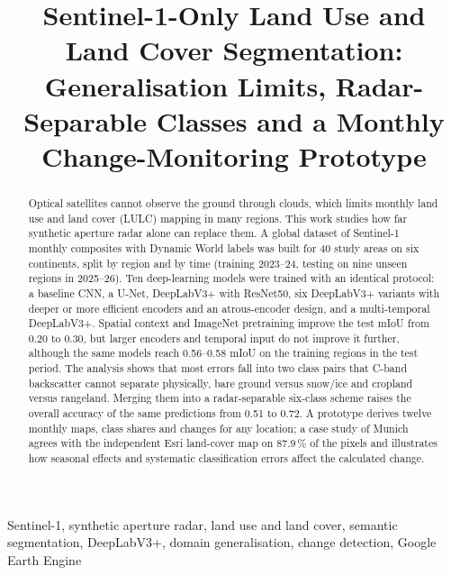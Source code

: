 \documentclass[12pt,conference]{IEEEtran}
\begin{document}
\title{Sentinel-1-Only Land Use and Land Cover Segmentation: Generalisation Limits, Radar-Separable Classes and a
Monthly Change-Monitoring Prototype}

\author{
}

\maketitle

\begin{abstract}
Optical satellites cannot observe the ground through clouds, which limits monthly land use and land cover (LULC)
mapping in many regions. This work studies how far synthetic aperture radar alone can replace them. A global dataset
of Sentinel-1 monthly composites with Dynamic World labels was built for 40 study areas on six continents, split by
region and by time (training 2023--24, testing on nine unseen regions in 2025--26). Ten deep-learning models were
trained with an identical protocol: a baseline CNN, a U-Net, DeepLabV3+ with ResNet50, six DeepLabV3+ variants with
deeper or more efficient encoders and an atrous-encoder design, and a multi-temporal DeepLabV3+. Spatial context and
ImageNet pretraining improve the test mIoU from 0.20 to 0.30, but larger encoders and temporal input do not improve it
further, although the same models reach 0.56--0.58 mIoU on the training regions in the test period. The analysis
shows that most errors fall into two class pairs that C-band backscatter cannot separate physically, bare ground versus
snow/ice and cropland versus rangeland. Merging them into a radar-separable six-class scheme raises the overall
accuracy of the same predictions from 0.51 to 0.72. A prototype derives twelve monthly maps, class shares and changes
for any location; a case study of Munich agrees with the independent Esri land-cover map on 87.9\,\% of the pixels and
illustrates how seasonal effects and systematic classification errors affect the calculated change.
\end{abstract}

\begin{IEEEkeywords}
Sentinel-1, synthetic aperture radar, land use and land cover, semantic segmentation, DeepLabV3+, domain
generalisation, change detection, Google Earth Engine
\end{IEEEkeywords}

\end{document}
